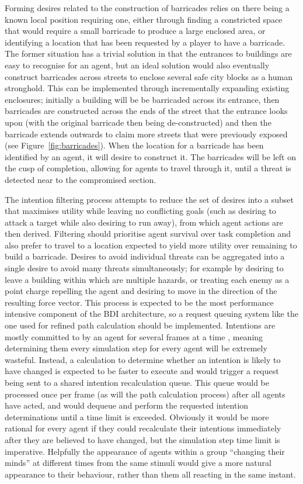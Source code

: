 \documentclass[a4paper,12pt]{article}
\begin{document}
Forming desires related to the construction of barricades relies on there being a known local position requiring one, either through finding a constricted space that would require a small barricade to produce a large enclosed area, or identifying a location that has been requested by a player to have a barricade. The former situation has a trivial solution in that the entrances to buildings are easy to recognise for an agent, but an ideal solution would also eventually construct barricades across streets to enclose several safe city blocks as a human stronghold. This can be implemented through incrementally expanding existing enclosures; initially a building will be be barricaded across its entrance, then barricades are constructed across the ends of the street that the entrance looks upon (with the original barricade then being de-constructed) and then the barricade extends outwards to claim more streets that were previously exposed (see Figure~\ref{fig:barricades}). When the location for a barricade has been identified by an agent, it will desire to construct it. The barricades will be left on the cusp of completion, allowing for agents to travel through it, until a threat is detected near to the compromised section.

The intention filtering process attempts to reduce the set of desires into a subset that maximises utility while leaving no conflicting goals (such as desiring to attack a target while also desiring to run away), from which agent actions are then derived. Filtering should prioritise agent survival over task completion and also prefer to travel to a location expected to yield more utility over remaining to build a barricade. Desires to avoid individual threats can be aggregated into a single desire to avoid many threats simultaneously; for example by desiring to leave a building within which are multiple hazards, or treating each enemy as a point charge repelling the agent and desiring to move in the direction of the resulting force vector. This process is expected to be the most performance intensive component of the BDI architecture, so a request queuing system like the one used for refined path calculation should be implemented. Intentions are mostly committed to by an agent for several frames at a time \cite{bonura09}, meaning determining them every simulation step for every agent will be extremely wasteful. Instead, a calculation to determine whether an intention is likely to have changed is expected to be faster to execute and would trigger a request being sent to a shared intention recalculation queue. This queue would be processed once per frame (as will the path calculation process) after all agents have acted, and would dequeue and perform the requested intention determinations until a time limit is exceeded. Obviously it would be more rational for every agent if they could recalculate their intentions immediately after they are believed to have changed, but the simulation step time limit is imperative. Helpfully the appearance of agents within a group ``changing their minds'' at different times from the same stimuli would give a more natural appearance to their behaviour, rather than them all reacting in the same instant.
\end{document}
